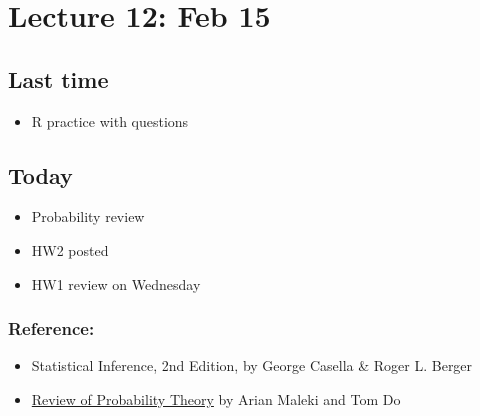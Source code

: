 \setcounter{section}{11}


\section{Lecture 12: Feb 15}


\subsection*{Last time}
\begin{itemize}
  \item R practice with questions
\end{itemize}


\subsection*{Today}
\begin{itemize}
 \item Probability review
 \item HW2 posted
 \item HW1 review on Wednesday
\end{itemize}

\subsubsection*{Reference: }
\begin{itemize}
  \item Statistical Inference, 2nd Edition, by George Casella \& Roger L. Berger
  \item  \href{http://cs229.stanford.edu/section/cs229-prob.pdf}{Review of Probability Theory} by Arian Maleki and Tom Do
\end{itemize}

